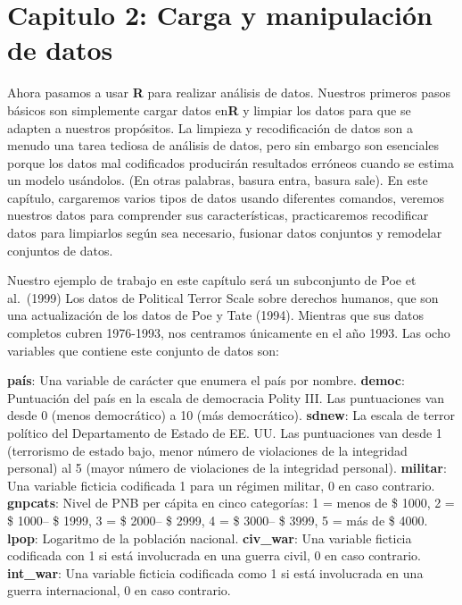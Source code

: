 \documentclass[
]{book}
\begin{document}
\hypertarget{Capitulo2Cargaymanipulaciuxf3ndedatos}{%
\chapter{\texorpdfstring{\textbf{Capitulo 2: Carga y manipulación de datos}}{Capitulo 2: Carga y manipulación de datos}}\label{Capitulo2Cargaymanipulaciuxf3ndedatos}}

Ahora pasamos a usar \textbf{R} para realizar análisis de datos. Nuestros primeros pasos básicos son simplemente cargar datos en\textbf{R} y limpiar los datos para que se adapten a nuestros propósitos. La limpieza y recodificación de datos son a menudo una tarea tediosa de análisis de datos, pero sin embargo son esenciales porque los datos mal codificados producirán resultados erróneos cuando se estima un modelo usándolos. (En otras palabras, basura entra, basura sale). En este capítulo, cargaremos varios tipos de datos usando diferentes comandos, veremos nuestros datos para comprender sus características, practicaremos recodificar datos para limpiarlos según sea necesario, fusionar datos conjuntos y remodelar conjuntos de datos.

Nuestro ejemplo de trabajo en este capítulo será un subconjunto de Poe et al.~(1999)
Los datos de Political Terror Scale sobre derechos humanos, que son una actualización de los datos de Poe y Tate (1994). Mientras que sus datos completos cubren 1976-1993, nos centramos únicamente en el año 1993. Las ocho variables que contiene este conjunto de datos son:

\textbf{país}: Una variable de carácter que enumera el país por nombre.
\textbf{democ}: Puntuación del país en la escala de democracia Polity III. Las puntuaciones van desde 0 (menos democrático) a 10 (más democrático).
\textbf{sdnew}: La escala de terror político del Departamento de Estado de EE. UU. Las puntuaciones van desde 1 (terrorismo de estado bajo, menor número de violaciones de la integridad personal) al 5 (mayor número de violaciones de la integridad personal).
\textbf{militar}: Una variable ficticia codificada 1 para un régimen militar, 0 en caso contrario.
\textbf{gnpcats}: Nivel de PNB per cápita en cinco categorías: 1 = menos de \$ 1000, 2 = \$ 1000-- \$ 1999, 3 = \$ 2000-- \$ 2999, 4 = \$ 3000-- \$ 3999, 5 = más de \$ 4000.
\textbf{lpop}: Logaritmo de la población nacional.
\textbf{civ\_war}: Una variable ficticia codificada con 1 si está involucrada en una guerra civil, 0 en caso contrario.
\textbf{int\_war}: Una variable ficticia codificada como 1 si está involucrada en una guerra internacional, 0 en caso contrario.
\end{document}
